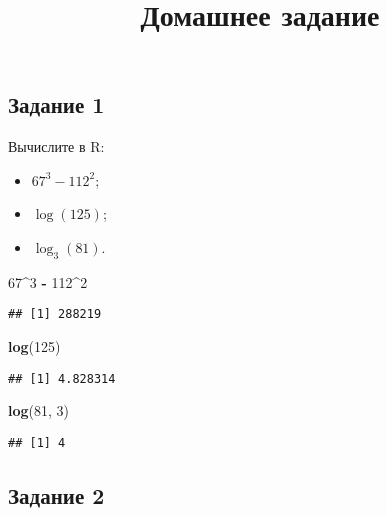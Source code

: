 \documentclass[
]{article}
\title{Домашнее задание}
\author{}
\date{\vspace{-2.5em}}
\newenvironment{Shaded}{\begin{snugshade}}{\end{snugshade}}
\newcommand{\DecValTok}[1]{\textcolor[rgb]{0.00,0.00,0.81}{#1}}
\newcommand{\KeywordTok}[1]{\textcolor[rgb]{0.13,0.29,0.53}{\textbf{#1}}}
\newcommand{\NormalTok}[1]{#1}
\newcommand{\OperatorTok}[1]{\textcolor[rgb]{0.81,0.36,0.00}{\textbf{#1}}}
\newcommand{\StringTok}[1]{\textcolor[rgb]{0.31,0.60,0.02}{#1}}
\providecommand{\tightlist}{%
  \setlength{\itemsep}{0pt}\setlength{\parskip}{0pt}}
\begin{document}
\maketitle

\hypertarget{ux437ux430ux434ux430ux43dux438ux435-1}{%
\subsection{Задание 1}\label{ux437ux430ux434ux430ux43dux438ux435-1}}

Вычислите в R:

\begin{itemize}
\tightlist
\item
  \(67 ^ 3 - 112 ^ 2\);
\item
  \(\log(125)\);
\item
  \(\log_3(81)\).
\end{itemize}

\begin{Shaded}
\begin{Highlighting}[]
\DecValTok{67}\OperatorTok{^}\DecValTok{3} \OperatorTok{-}\StringTok{ }\DecValTok{112}\OperatorTok{^}\DecValTok{2}
\end{Highlighting}
\end{Shaded}

\begin{verbatim}
## [1] 288219
\end{verbatim}

\begin{Shaded}
\begin{Highlighting}[]
\KeywordTok{log}\NormalTok{(}\DecValTok{125}\NormalTok{)}
\end{Highlighting}
\end{Shaded}

\begin{verbatim}
## [1] 4.828314
\end{verbatim}

\begin{Shaded}
\begin{Highlighting}[]
\KeywordTok{log}\NormalTok{(}\DecValTok{81}\NormalTok{, }\DecValTok{3}\NormalTok{)}
\end{Highlighting}
\end{Shaded}

\begin{verbatim}
## [1] 4
\end{verbatim}

\hypertarget{ux437ux430ux434ux430ux43dux438ux435-2}{%
\subsection{Задание 2}\label{ux437ux430ux434ux430ux43dux438ux435-2}}
\end{document}

